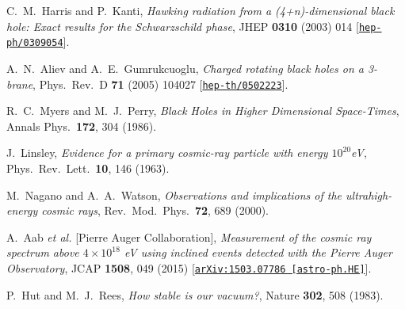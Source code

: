 \documentclass[aps,12pt,prd,superscriptaddress,preprintnumbers, 
	amssymb,
	amsmath,
	notitlepage,
	longbibliography,
	nofootinbib]{revtex4-1}
\begin{document}
\begin{thebibliography}{10}
C.~M.~Harris and P.~Kanti,
{\it Hawking radiation from a (4+n)-dimensional black hole: 
Exact results for the Schwarzschild phase},
JHEP {\bf 0310} (2003) 014
[\href{http://xxx.lanl.gov/abs/hep-ph/0309054}{{\tt hep-ph/0309054}}].
  
A.~N.~Aliev and A.~E.~Gumrukcuoglu,
{\it Charged rotating black holes on a 3-brane},
Phys.\ Rev.\ D {\bf 71} (2005) 104027
[\href{http://xxx.lanl.gov/abs/hep-th/0502223}{{\tt hep-th/0502223}}].

R.~C.~Myers and M.~J.~Perry,
{\it Black Holes in Higher Dimensional Space-Times},
Annals Phys.\  {\bf 172}, 304 (1986).

J.~Linsley,
{\it Evidence for a primary cosmic-ray particle with energy $10^{20}$eV},
Phys.\ Rev.\ Lett.\  {\bf 10}, 146 (1963).

M.~Nagano and A.~A.~Watson,
{\it Observations and implications of the ultrahigh-energy cosmic rays},
Rev.\ Mod.\ Phys.\  {\bf 72}, 689 (2000).

A.~Aab {\it et al.} [Pierre Auger Collaboration],
{\it Measurement of the cosmic ray spectrum above $4\times10^{18}$ 
eV using inclined events detected with the Pierre Auger Observatory},
JCAP {\bf 1508}, 049 (2015)
[\href{http://xxx.lanl.gov/abs/1503.07786}{{\tt arXiv:1503.07786 [astro-ph.HE]}}]. 

P.~Hut and M.~J.~Rees,
{\it How stable is our vacuum?},
Nature {\bf 302}, 508 (1983).  

\end{thebibliography}\endgroup
\end{document}
